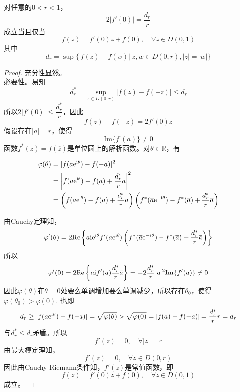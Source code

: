 \begin{theorem}\label{theorem:complex}

    对任意的$0 < r < 1$，
    \[2|f'(0)| = \dfrac{d_r}{r}\]
    成立当且仅当
    \[f(z) = f'(0)z + f(0), \quad \forall z \in D(0, 1)\]
    其中
    \[d_r = \sup\{|f(z) - f(w)|\big| z, w \in D(0, r), |z| = |w|\}\]
    
\end{theorem}

\begin{proof}
    
    充分性显然。\\
    必要性。易知
    \[d_r^{*} = \sup\limits_{z \in D(0, r)}{|f(z) - f(-z)|} \leq d_r\]
    所以$2|f'(0)| \leq \dfrac{d_r^{*}}{r}$，因此
    \[f(z) - f(-z) = 2f'(0)z\]
    假设存在$|a| = r$，使得
    \[\mathrm{Im}\{f'(a)\} \neq 0\]
    函数$f^{*}(z) = \overline{f(\overline{z})}$是单位圆上的解析函数。对$\theta \in \mathbb{R}$，有

    \begin{align*}
        \varphi(\theta) & = |f(a\mathrm{e}^{\mathrm{i} \theta}) - f(-a)|^2 \\
        & = \left| f(a\mathrm{e}^{\mathrm{i} \theta}) - f(a) + \dfrac{d_r^{*}}{r}a \right|^2 \\
        & = \left( f(a\mathrm{e}^{\mathrm{i} \theta}) - f(a) + \dfrac{d_r^{*}}{r}a \right) \left( f^{*}(\overline{a}\mathrm{e}^{-\mathrm{i} \theta}) - f^{*}(\overline{a}) + \dfrac{d_r^{*}}{r}\overline{a} \right)
    \end{align*}

    由\textup{Cauchy}定理知，
    \[\varphi'(\theta) = 2 \mathrm{Re}\left\{ a\mathrm{i} \mathrm{e}^{\mathrm{i} \theta}f'(a\mathrm{e}^{\mathrm{i} \theta}) \left( f^{*}(\overline{a}\mathrm{e}^{-\mathrm{i} \theta}) - f^{*}(\overline{a}) + \dfrac{d_r^{*}}{r}\overline{a} \right) \right\}\]
    所以
    \[\varphi'(0) = 2 \mathrm{Re}\left\{ a\mathrm{i} f'(a)\dfrac{d_r^{*}}{r}\overline{a} \right\} = -2\dfrac{d_r^{*}}{r}|a|^2\mathrm{Im}\{f'(a)\} \neq 0\]
    因此$\varphi(\theta)$在$\theta = 0$处要么单调增加要么单调减少，所以存在$\theta_0$，使得$\varphi(\theta_0) > \varphi(0)$. 也即
    \[d_r \geq |f(a\mathrm{e}^{\mathrm{i} \theta}) - f(-a)| = \sqrt{\varphi(\theta)} > \sqrt{\varphi(0)} = |f(a) - f(-a)| = \dfrac{d_r^{*}}{r}r = d_r\]
    与$d_r^{*} \leq d_r$矛盾。所以
    \[f'(z) = 0, \quad \forall |z| = r\]
    由最大模定理知，
    \[f'(z) = 0, \quad \forall z \in D(0, r)\]
    因此由\textup{Cauchy-Riemann}条件知，$f'(z)$是常值函数，即
    \[f(z) = f'(0)z + f(0), \quad \forall z \in D(0, 1)\]
    成立。
    
\end{proof}

